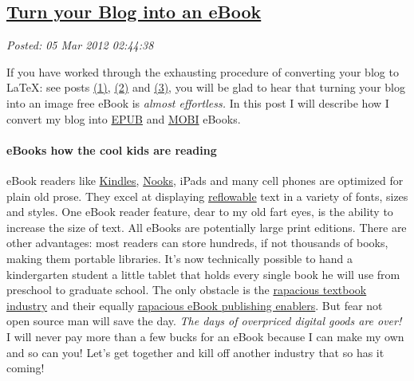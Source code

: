 %

\subsection*{\href{https://bakerjd99.wordpress.com/2012/03/04/turn-your-blog-into-an-ebook/}{Turn your Blog into an eBook}}


\noindent\emph{Posted: 05 Mar 2012 02:44:38}
\vspace{6pt}

If you have worked through the exhausting procedure of converting your
blog to \LaTeX: see posts
\href{http://bakerjd99.wordpress.com/2012/02/11/wordpress-to-latex-with-pandoc-and-j-prerequisites-part-1/}{(1)},
\href{http://bakerjd99.wordpress.com/2012/02/18/wordpress-to-latex-with-pandoc-and-j-latex-directories-part-2-2/}{(2)}
and
\href{http://bakerjd99.wordpress.com/2012/02/25/wordpress-to-latex-with-pandoc-and-j-using-texfrwpxml-ijs-part-3/}{(3)},
you will be glad to hear that turning your blog into an image free eBook
is \emph{almost effortless.} In this post I will describe how I convert
my blog into \href{https://www.w3.org/community/epub3/}{EPUB}
and \href{https://fileinfo.com/extension/mobi}{MOBI} eBooks.

\paragraph{eBooks how the cool kids are reading}

eBook readers like
\href{http://www.amazon.com/gp/feature.html?ie=UTF8\&docId=1000750701\&tag=googhydr-20\&hvadid=9562889797\&ref=pd\_sl\_1hhrk6zi46\_e}{Kindles},
\href{http://www.barnesandnoble.com/u/nook/379003208?r=1\&utm\_source=google\&cm\_mmc=Google-\_-NOOK\%20General-\_-NOOK\%20(exact)-\_-Nook\&cm\_mmca1=1d6c97e6-5d23-2769-73f9-00005e04715e\&utm\_medium=cpc\&utm\_term=no}{Nooks},
iPads and many cell phones are optimized for plain old prose. They excel
at displaying
\href{https://en.wikipedia.org/wiki/Reflowable_document}{reflowable}
text in a variety of fonts, sizes and styles. One eBook reader feature,
dear to my old fart eyes, is the ability to increase the size of text.
All eBooks are potentially large print editions. There are other
advantages: most readers can store hundreds, if not thousands of books,
making them portable libraries. It's now technically possible to hand a
kindergarten student a little tablet that holds every single book he
will use from preschool to graduate school. The only obstacle is the
\href{http://funny-about-money.com/2010/07/20/textbook-ripoffs-why-college-leaves-kids-in-debt/}{rapacious
textbook industry} and their equally
\href{http://www.zdnet.com/blog/mobile-news/why-the-apple-textbook-program-will-never-work/6526}{rapacious
eBook publishing enablers}. But fear not open
source man will save the day. \emph{The days of overpriced digital
goods are over!} I will never pay more than a few bucks for an eBook
because I can make my own and so can you! Let's get together and kill
off another industry that so has it coming!

